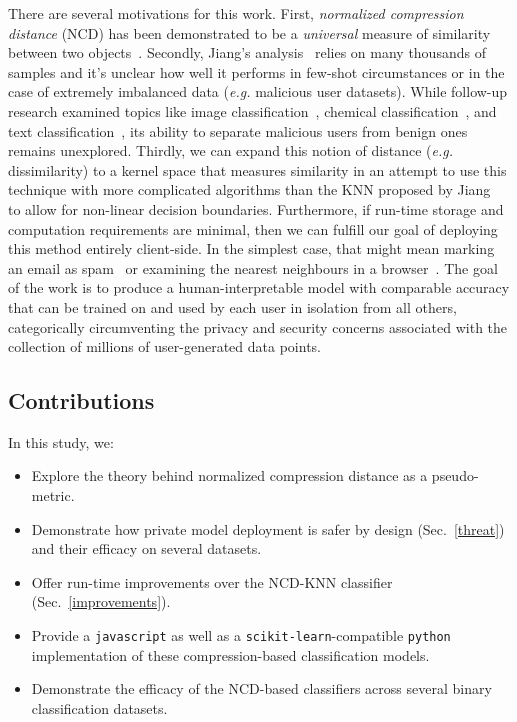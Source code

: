 \documentclass[conference]{IEEEtran}
\begin{document}
There are several motivations for this work. 
First, \textit{normalized compression distance} (NCD) has been demonstrated to be a \textit{universal} measure of similarity between two objects~\cite{ncd}.
Secondly, Jiang's analysis~\cite{jiang2022less} relies on many thousands of samples and it's unclear how well it performs in few-shot circumstances or in the case of extremely imbalanced data (\textit{e.g.} malicious user datasets).
While follow-up research examined topics like image classification~\cite{opitz2023gzip}, chemical classification~\cite{weinreich2023parameter}, and text classification~\cite{nishida2011tweet}, its ability to separate malicious users from benign ones remains unexplored. 
Thirdly, we can expand this notion of distance (\textit{e.g.} dissimilarity) to a kernel space that measures similarity in an attempt to use this technique with more complicated algorithms than the KNN proposed by Jiang~\cite{jiang2022less} to allow for non-linear decision boundaries. 
Furthermore, if run-time storage and computation requirements are minimal, then we can fulfill our goal of deploying this method entirely client-side.
In the simplest case, that might mean marking an email as spam~\cite{ansuz_email} or examining the nearest neighbours in a browser~\cite{ansuz_browser}. The goal of the work is to produce a human-interpretable model with comparable accuracy that can be trained on and used by each user in isolation from all others, categorically circumventing the privacy and security concerns associated with the collection of millions of user-generated data points.



\subsection{Contributions}
In this study, we:

\begin{itemize}
    \item Explore the theory behind normalized compression distance as a pseudo-metric.
    \item Demonstrate how private model deployment is safer by design (Sec.~\ref{threat}) and their efficacy on several datasets.
    \item Offer run-time improvements over the NCD-KNN classifier (Sec.~\ref{improvements}).
    \item Provide a \texttt{javascript} as well as a \texttt{scikit-learn}-compatible \texttt{python} implementation of these compression-based classification models.
    \item Demonstrate the efficacy of the NCD-based classifiers across several binary classification datasets.
\end{itemize}
\end{document}
